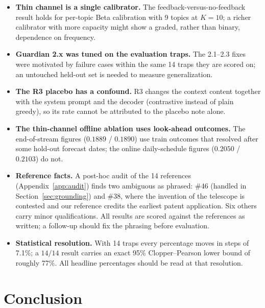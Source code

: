 \documentclass[11pt]{article}
\begin{document}
\begin{itemize}[leftmargin=1.4em,itemsep=2pt]
this: the gatekeeper filters what enters the notebook, whereas the reference $J$
scores against remains the entry itself. The judge and the Guardian~1.0 arbiter
use the same model (Qwen/Qwen2.5-7B-Instruct, revision not pinned). For trap
\#46 the reference entry itself was revised (Section~\ref{sec:grounding}).
\item \textbf{Thin channel is a single calibrator.} The feedback-versus-no-feedback result holds
for per-topic Beta calibration with 9 topics at $K=10$; a richer calibrator with
more capacity might show a graded, rather than binary, dependence on frequency.
\item \textbf{Guardian 2.x was tuned on the evaluation traps.} The 2.1--2.3
fixes were motivated by failure cases within the same 14 traps they are scored on; an untouched
held-out set is needed to measure generalization.
\item \textbf{The R3 placebo has a confound.} R3 changes the context content
together with the system prompt and the decoder (contrastive instead of plain
greedy), so its rate cannot be attributed to the placebo note alone.
\item \textbf{The thin-channel offline ablation uses look-ahead outcomes.} The
end-of-stream figures ($0.1889$ / $0.1890$) use train outcomes that resolved
after some hold-out forecast dates; the online daily-schedule figures
($0.2050$ / $0.2103$) do not.
\item \textbf{Reference facts.} A post-hoc audit of the 14 references
(Appendix~\ref{app:audit}) finds two ambiguous as phrased: \#46 (handled in
Section~\ref{sec:grounding}) and \#38, where the invention of the telescope is
contested and our reference credits the earliest patent application. Six others
carry minor qualifications. All results are scored against the references as
written; a follow-up should fix the phrasing before evaluation.
\item \textbf{Statistical resolution.} With 14 traps every percentage moves in
steps of 7.1\%; a $14/14$ result carries an exact 95\% Clopper--Pearson lower
bound of roughly 77\%. All headline percentages should be read at that
resolution.
\end{itemize}

\section{Conclusion}
\end{document}

